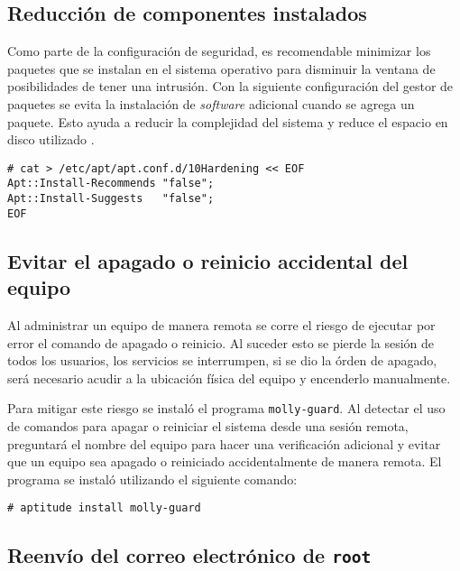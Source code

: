       \subsection {Reducci\'{o}n de componentes instalados}

Como parte de la configuraci\'{o}n de seguridad, es recomendable minimizar los paquetes que se instalan en el sistema operativo para disminuir la ventana de posibilidades de tener una intrusi\'{o}n. Con la siguiente configuraci\'{o}n del gestor de paquetes se evita la instalaci\'{o}n de \textit{software} adicional cuando se agrega un paquete. Esto ayuda a reducir la complejidad del sistema y reduce el espacio en disco utilizado \cite{_configuration_????}.

{
\scriptsize
\linespread{1}
\begin{verbatim}
# cat > /etc/apt/apt.conf.d/10Hardening << EOF
Apt::Install-Recommends "false";
Apt::Install-Suggests   "false";
EOF
\end{verbatim}
}

      \subsection {Evitar el apagado o reinicio accidental del equipo}

Al administrar un equipo de manera remota se corre el riesgo de ejecutar por error el comando de apagado o reinicio. Al suceder esto se pierde la sesi\'{o}n de todos los usuarios, los servicios se interrumpen, si se dio la \'{o}rden de apagado, ser\'{a} necesario acudir a la ubicaci\'{o}n f\'{i}sica del equipo y encenderlo manualmente.

Para mitigar este riesgo se instal\'{o} el programa \texttt{molly-guard}. Al detectar el uso de comandos para apagar o reiniciar el sistema desde una sesi\'{o}n remota, preguntar\'{a} el nombre del equipo para hacer una verificaci\'{o}n adicional y evitar que un equipo sea apagado o reiniciado accidentalmente de manera remota. El programa se instal\'{o} utilizando el siguiente comando:

{
\scriptsize
\linespread{1}
\begin{verbatim}
# aptitude install molly-guard
\end{verbatim}
}

      \subsection {Reenv\'{i}o del correo electr\'{o}nico de \texttt{root}}


